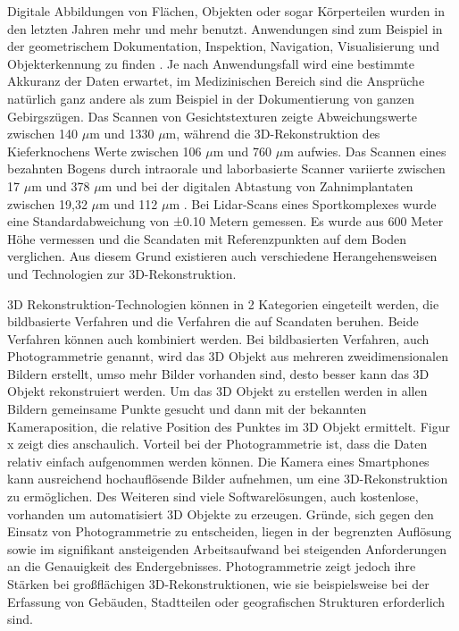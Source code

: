 Digitale Abbildungen von Flächen, Objekten oder sogar Körperteilen wurden in den
letzten Jahren mehr und mehr benutzt. Anwendungen sind zum Beispiel in der
geometrischem Dokumentation, Inspektion, Navigation, Visualisierung und 
Objekterkennung zu finden \cite{Verykokou.2023}. Je nach Anwendungsfall wird eine
bestimmte Akkuranz
der Daten erwartet, im Medizinischen Bereich sind die Ansprüche natürlich ganz 
andere als zum Beispiel in der Dokumentierung von ganzen Gebirgszügen.
Das Scannen von Gesichtstexturen zeigte Abweichungswerte zwischen 140 $\mu$m und 
1330 $\mu$m, während die 3D-Rekonstruktion des Kieferknochens Werte zwischen 106 $\mu$m 
und 760 $\mu$m aufwies. 
Das Scannen eines bezahnten Bogens durch intraorale und laborbasierte
Scanner variierte zwischen 17 $\mu$m und 378 $\mu$m und bei der 
digitalen Abtastung von Zahnimplantaten zwischen 19,32 $\mu$m
und 112 $\mu$m \cite{Bohner.2019}.
Bei Lidar-Scans eines Sportkomplexes wurde eine Standardabweichung von ±0.10 Metern
gemessen. Es wurde aus 600 Meter Höhe vermessen und die Scandaten mit 
Referenzpunkten auf dem Boden verglichen. \cite{Elaksher.2023}
Aus diesem Grund existieren auch verschiedene Herangehensweisen und Technologien  
zur 3D-Rekonstruktion.

3D Rekonstruktion-Technologien können in 2 Kategorien eingeteilt werden,
die bildbasierte Verfahren und die Verfahren die auf Scandaten 
beruhen. \cite{Verykokou.2023}
Beide Verfahren können auch kombiniert werden. 
Bei bildbasierten Verfahren, auch Photogrammetrie genannt, wird das 3D Objekt aus
mehreren zweidimensionalen Bildern erstellt, 
umso mehr Bilder vorhanden sind, desto besser kann das
3D Objekt rekonstruiert werden. Um das 3D Objekt zu erstellen werden in 
allen Bildern gemeinsame Punkte gesucht und dann mit der bekannten Kameraposition, 
die relative Position des Punktes im 3D Objekt ermittelt. Figur x zeigt dies 
anschaulich.
Vorteil bei der Photogrammetrie ist, dass die Daten relativ einfach aufgenommen werden
können. Die Kamera eines Smartphones kann ausreichend hochauflösende Bilder aufnehmen, um 
eine 3D-Rekonstruktion zu ermöglichen. Des Weiteren sind viele Softwarelösungen,
auch kostenlose, vorhanden um automatisiert 3D Objekte zu erzeugen.
Gründe, sich gegen den Einsatz von Photogrammetrie zu entscheiden, 
liegen in der begrenzten Auflösung sowie im signifikant ansteigenden Arbeitsaufwand 
bei steigenden Anforderungen an die Genauigkeit des Endergebnisses. 
Photogrammetrie zeigt jedoch ihre Stärken bei großflächigen 3D-Rekonstruktionen, 
wie sie beispielsweise bei der Erfassung von Gebäuden, Stadtteilen oder geografischen 
Strukturen erforderlich sind.

